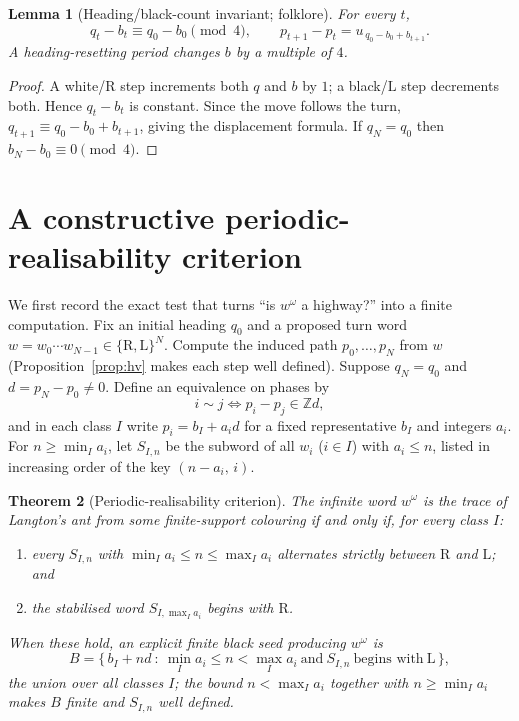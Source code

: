 \documentclass[11pt,letterpaper]{article}
\theoremstyle{plain}
\newtheorem{theorem}{Theorem}[section]
\newtheorem{lemma}[theorem]{Lemma}
\theoremstyle{definition}
\newcommand{\Z}{\mathbb{Z}}
\newcommand{\drift}{d}
\newcommand{\turnR}{\mathrm{R}}
\newcommand{\turnL}{\mathrm{L}}
\begin{document}
\begin{NoHyper}
\begin{lemma}[Heading/black-count invariant; folklore]\label{lem:invariant}
For every $t$,
\begin{equation}\label{eq:invariant}
q_t-b_t\equiv q_0-b_0\pmod 4,\qquad p_{t+1}-p_t=u_{\,q_0-b_0+b_{t+1}} .
\end{equation}
A heading-resetting period changes $b$ by a multiple of $4$.
\end{lemma}

\begin{proof}
A white/$\turnR$ step increments both $q$ and $b$ by $1$; a black/$\turnL$ step
decrements both. Hence $q_t-b_t$ is constant. Since the move follows the turn,
$q_{t+1}\equiv q_0-b_0+b_{t+1}$, giving the displacement formula. If $q_N=q_0$ then
$b_N-b_0\equiv 0\pmod4$.
\end{proof}

\section{A constructive periodic-realisability criterion}\label{sec:criterion}

We first record the exact test that turns ``is $w^\omega$ a highway?'' into a finite
computation. Fix an initial heading $q_0$ and a proposed turn word
$w=w_0\cdots w_{N-1}\in\{\turnR,\turnL\}^N$. Compute the induced path
$p_0,\dots,p_N$ from $w$ (Proposition~\ref{prop:hv} makes each step well defined).
Suppose $q_N=q_0$ and $\drift=p_N-p_0\neq0$. Define an equivalence on phases by
\[
i\sim j\iff p_i-p_j\in\Z\drift,
\]
and in each class $I$ write $p_i=b_I+a_i\drift$ for a fixed representative $b_I$ and
integers $a_i$. For $n\ge\min_I a_i$, let $S_{I,n}$ be the subword of all $w_i$
($i\in I$) with $a_i\le n$, listed in increasing order of the key $(n-a_i,\,i)$.

\begin{theorem}[Periodic-realisability criterion]\label{thm:criterion}
The infinite word $w^\omega$ is the trace of Langton's ant from some finite-support
colouring if and only if, for every class $I$:
\begin{enumerate}[label=\textup{(\roman*)}]
\item every $S_{I,n}$ with $\min_I a_i\le n\le\max_I a_i$ alternates strictly between
$\turnR$ and $\turnL$; and
\item the stabilised word $S_{I,\max_I a_i}$ begins with $\turnR$.
\end{enumerate}
When these hold, an explicit finite black seed producing $w^\omega$ is
\begin{equation}\label{eq:seed}
B=\bigl\{\,b_I+n\drift\ :\ \textstyle\min_I a_i\le n<\max_I a_i\ \text{and}\ S_{I,n}\ \text{begins with}\ \turnL\,\bigr\},
\end{equation}
the union over all classes $I$; the bound $n<\max_I a_i$ together with
$n\ge\min_I a_i$ makes $B$ finite and $S_{I,n}$ well defined.
\end{theorem}


\end{NoHyper}
\end{document}

